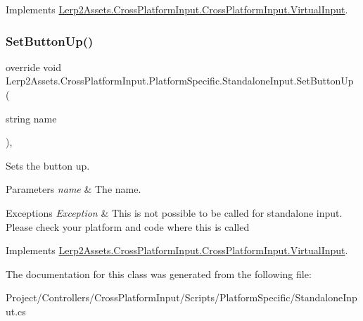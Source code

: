 Implements \hyperlink{class_lerp2_assets_1_1_cross_platform_input_1_1_cross_platform_input_1_1_virtual_input_a05c1d0c7a50c30a22c52bf460ec6a17a}{Lerp2\+Assets.\+Cross\+Platform\+Input.\+Cross\+Platform\+Input.\+Virtual\+Input}.

\mbox{\label{class_lerp2_assets_1_1_cross_platform_input_1_1_platform_specific_1_1_standalone_input_a1f0d1a8eab3bd627b8c62ec3ef601576}} 
\subsubsection{\texorpdfstring{Set\+Button\+Up()}{SetButtonUp()}}
{\footnotesize\ttfamily override void Lerp2\+Assets.\+Cross\+Platform\+Input.\+Platform\+Specific.\+Standalone\+Input.\+Set\+Button\+Up (\begin{DoxyParamCaption}\item[{string}]{name }\end{DoxyParamCaption})\hspace{0.3cm}{\ttfamily [inline]}, {\ttfamily [virtual]}}



Sets the button up. 


\begin{DoxyParams}{Parameters}
{\em name} & The name.\\
\hline
\end{DoxyParams}

\begin{DoxyExceptions}{Exceptions}
{\em Exception} & This is not possible to be called for standalone input. Please check your platform and code where this is called\\
\hline
\end{DoxyExceptions}


Implements \hyperlink{class_lerp2_assets_1_1_cross_platform_input_1_1_cross_platform_input_1_1_virtual_input_ae813c350c71501f35ed2aefa375b233c}{Lerp2\+Assets.\+Cross\+Platform\+Input.\+Cross\+Platform\+Input.\+Virtual\+Input}.



The documentation for this class was generated from the following file\+:\begin{DoxyCompactItemize}
\item 
Project/\+Controllers/\+Cross\+Platform\+Input/\+Scripts/\+Platform\+Specific/Standalone\+Input.\+cs\end{DoxyCompactItemize}

